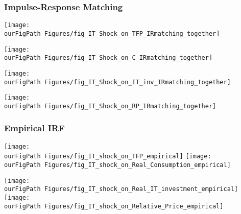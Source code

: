 \documentclass{beamer}
\def \ourFigPath {../../}
\begin{document}
\begin{frame}
\frametitle{Impulse-Response Matching}


\begin{minipage}[t]{0.48\linewidth}
\begin{center}
	\texttt{[image: \\ourFigPath Figures/fig\_IT\_Shock\_on\_TFP\_IRmatching\_together]}
\end{center}
\begin{center}
	\texttt{[image: \\ourFigPath Figures/fig\_IT\_Shock\_on\_C\_IRmatching\_together]}
\end{center}
\end{minipage}\hfill
\begin{minipage}[t]{0.48\linewidth}
\begin{center}
	\texttt{[image: \\ourFigPath Figures/fig\_IT\_Shock\_on\_IT\_inv\_IRmatching\_together]}
\end{center}
\begin{center}
	\texttt{[image: \\ourFigPath Figures/fig\_IT\_Shock\_on\_RP\_IRmatching\_together]}
\end{center}
\end{minipage}


\end{frame}


\begin{frame}
\frametitle{Empirical IRF}

\begin{minipage}[t]{0.48\linewidth}
\begin{center}
	\texttt{[image: \\ourFigPath Figures/fig\_IT\_shock\_on\_TFP\_empirical]}
	\texttt{[image: \\ourFigPath Figures/fig\_IT\_shock\_on\_Real\_Consumption\_empirical]}
\end{center}
\end{minipage}\hfill
\begin{minipage}[t]{0.48\linewidth}
\begin{center}
	\texttt{[image: \\ourFigPath Figures/fig\_IT\_shock\_on\_Real\_IT\_investment\_empirical]}
	\texttt{[image: \\ourFigPath Figures/fig\_IT\_shock\_on\_Relative\_Price\_empirical]}
\end{center}
\end{minipage}


\end{frame}
\end{document}
